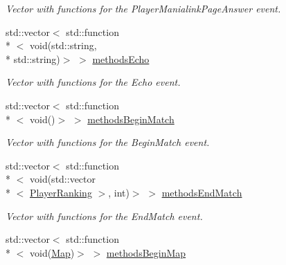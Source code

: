 \begin{DoxyCompactItemize}
\begin{DoxyCompactList}\small\item\em Vector with functions for the Player\-Manialink\-Page\-Answer event. \end{DoxyCompactList}\item 
\hypertarget{classEventManager_a61180225295324ec1240bb4a8d119866}{std\-::vector$<$ std\-::function\\*
$<$ void(std\-::string, \\*
std\-::string)$>$ $>$ \hyperlink{classEventManager_a61180225295324ec1240bb4a8d119866}{methods\-Echo}}\label{classEventManager_a61180225295324ec1240bb4a8d119866}

\begin{DoxyCompactList}\small\item\em Vector with functions for the Echo event. \end{DoxyCompactList}\item 
\hypertarget{classEventManager_abb7667e9222f00e33d792c733c82f89e}{std\-::vector$<$ std\-::function\\*
$<$ void()$>$ $>$ \hyperlink{classEventManager_abb7667e9222f00e33d792c733c82f89e}{methods\-Begin\-Match}}\label{classEventManager_abb7667e9222f00e33d792c733c82f89e}

\begin{DoxyCompactList}\small\item\em Vector with functions for the Begin\-Match event. \end{DoxyCompactList}\item 
\hypertarget{classEventManager_a57c6a54084081b1ea74736e30ad2e7cc}{std\-::vector$<$ std\-::function\\*
$<$ void(std\-::vector\\*
$<$ \hyperlink{structPlayerRanking}{Player\-Ranking} $>$, int)$>$ $>$ \hyperlink{classEventManager_a57c6a54084081b1ea74736e30ad2e7cc}{methods\-End\-Match}}\label{classEventManager_a57c6a54084081b1ea74736e30ad2e7cc}

\begin{DoxyCompactList}\small\item\em Vector with functions for the End\-Match event. \end{DoxyCompactList}\item 
\hypertarget{classEventManager_a7aa0f06399cd3927d85603b58cfef173}{std\-::vector$<$ std\-::function\\*
$<$ void(\hyperlink{structMap}{Map})$>$ $>$ \hyperlink{classEventManager_a7aa0f06399cd3927d85603b58cfef173}{methods\-Begin\-Map}}\label{classEventManager_a7aa0f06399cd3927d85603b58cfef173}


\end{DoxyCompactItemize}
